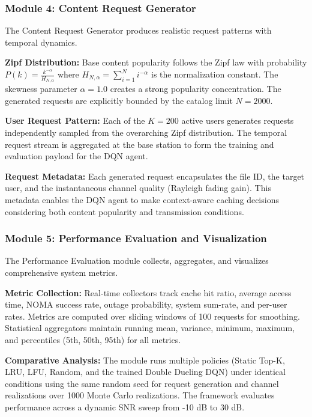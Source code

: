 \documentclass[12pt,a4paper]{article}
\begin{document}
\subsubsection{Module 4: Content Request Generator}

The Content Request Generator produces realistic request patterns with temporal dynamics.

\textbf{Zipf Distribution:} Base content popularity follows the Zipf law with probability $P(k) = \frac{k^{-\alpha}}{H_{N,\alpha}}$ where $H_{N,\alpha} = \sum_{i=1}^N i^{-\alpha}$ is the normalization constant. The skewness parameter $\alpha = 1.0$ creates a strong popularity concentration. The generated requests are explicitly bounded by the catalog limit $N=2000$.

\textbf{User Request Pattern:} Each of the $K=200$ active users generates requests independently sampled from the overarching Zipf distribution. The temporal request stream is aggregated at the base station to form the training and evaluation payload for the DQN agent.

\textbf{Request Metadata:} Each generated request encapsulates the file ID, the target user, and the instantaneous channel quality (Rayleigh fading gain). This metadata enables the DQN agent to make context-aware caching decisions considering both content popularity and transmission conditions.

\subsubsection{Module 5: Performance Evaluation and Visualization}

The Performance Evaluation module collects, aggregates, and visualizes comprehensive system metrics.

\textbf{Metric Collection:} Real-time collectors track cache hit ratio, average access time, NOMA success rate, outage probability, system sum-rate, and per-user rates. Metrics are computed over sliding windows of 100 requests for smoothing. Statistical aggregators maintain running mean, variance, minimum, maximum, and percentiles (5th, 50th, 95th) for all metrics.

\textbf{Comparative Analysis:} The module runs multiple policies (Static Top-K, LRU, LFU, Random, and the trained Double Dueling DQN) under identical conditions using the same random seed for request generation and channel realizations over 1000 Monte Carlo realizations. The framework evaluates performance across a dynamic SNR sweep from -10 dB to 30 dB.
\end{document}
